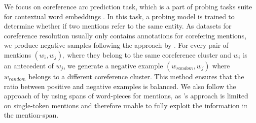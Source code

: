 \documentclass[11pt]{article}
\begin{document}


We focus on coreference arc prediction task, which is a part of probing tasks suite for contextual word embeddings \parencite{liu2019linguistic, tenney2019context}. In this task, a probing model is trained to determine whether if two mentions refer to the same entity. As datasets for coreference resolution usually only contains annotations for corefering mentions, we produce negative samples following the approach by \parencite{liu2019linguistic}. For every pair of mentions $(w_{i}, w_{j})$, where they belong to the same coreference cluster and $w_{i}$ is an antecedent of $w_{j}$, we generate a negative example $(w_{random}, w_{j})$ where $w_{random}$ belongs to a different coreference cluster. This method ensures that the ratio between positive and negative examples is balanced. We also follow the approach of \parencite{tenney2019context} by using spans of word-pieces for mentions, as \parencite{liu2019linguistic}'s approach is limited on single-token mentions and therefore unable to fully exploit the information in the mention-span.
\end{document}
